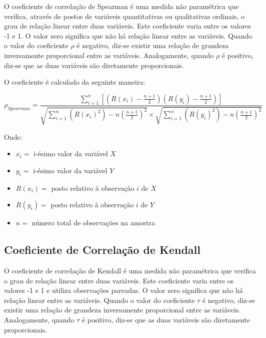 \documentclass[
  portuguese,
]{estat/estat}
\providecommand{\tightlist}{%
  \setlength{\itemsep}{0pt}\setlength{\parskip}{0pt}}
\begin{document}
O coeficiente de correlação de Spearman é uma medida não paramétrica que
verifica, através de postos de variáveis quantitativas ou qualitativas
ordinais, o grau de relação linear entre duas variáveis. Este
coeficiente varia entre os valores -1 e 1. O valor zero significa que
não há relação linear entre as variáveis. Quando o valor do coeficiente
\(\rho\) é negativo, diz-se existir uma relação de grandeza inversamente
proporcional entre as variáveis. Analogamente, quando \(\rho\) é
positivo, diz-se que as duas variáveis são diretamente proporcionais.

O coeficiente é calculado da seguinte maneira:

\[
\rho_{Spearman} = \frac{ \displaystyle \sum_{i=1}^{n}  \left[\left(R(x_i)-\frac{n+1}{2}\right)\left(R(y_i)-\frac{n+1}{2}\right)\right]}
{\sqrt{\displaystyle \sum_{i=1}^{n}  \left(R(x_i)^2\right)-n\left(\frac{n+1}{2}\right)^{2}}  \times \sqrt{\displaystyle \sum_{i=1}^{n}  \left(R(y_i)^2 \right) -n\left(\frac{n+1}{2}\right)^{2}}}
\]

Onde:

\begin{itemize}
\tightlist
\item
  \(x_i =\) i-ésimo valor da variável \(X\)
\item
  \(y_i =\) i-ésimo valor da variável \(Y\)
\item
  \(R(x_i) =\) posto relativo à observação \(i\) de \(X\)
\item
  \(R(y_i) =\) posto relativo à observação \(i\) de \(Y\)
\item
  \(n =\) número total de observações na amostra
\end{itemize}

\subsection{Coeficiente de Correlação de
Kendall}\label{coeficiente-de-correlauxe7uxe3o-de-kendall}

O coeficiente de correlação de Kendall é uma medida não paramétrica que
verifica o grau de relação linear entre duas variáveis. Este coeficiente
varia entre os valores -1 e 1 e utiliza observações pareadas. O valor
zero significa que não há relação linear entre as variáveis. Quando o
valor do coeficiente \(\tau\) é negativo, diz-se existir uma relação de
grandeza inversamente proporcional entre as variáveis. Analogamente,
quando \(\tau\) é positivo, diz-se que as duas variáveis são diretamente
proporcionais.
\end{document}
